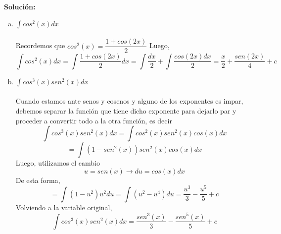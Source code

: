 \documentclass[12pt]{article}
\newenvironment{solucion}
{\begin{mdframed}[backgroundcolor=black!10]
		{\bf Solución:}\\
	}
	{
	\end{mdframed}
}
\newenvironment{preguntas}
{\begin{enumerate}\itemsep12pt
	}
	{
	\end{enumerate}
}
\newcommand{\ra}{\rightarrow}
\begin{document}
\begin{preguntas}
\begin{solucion}
\begin{enumerate}[a)]
\item $\displaystyle\int cos^2(x)dx$\\\\
			Recordemos que $cos^2(x) = \dfrac{1+cos(2x)}{2}$
			Luego,
			$$\displaystyle\int cos^2(x)dx 
			= \displaystyle\int \dfrac{1+cos(2x)}{2}dx
			= \displaystyle\int \dfrac{dx}{2} + \displaystyle\int \dfrac{cos(2x)dx}{2}
			= \dfrac{x}{2} + \dfrac{sen(2x)}{4} + c
			$$
\item $\displaystyle\int cos^3(x)sen^2(x)dx$\\\\
			Cuando estamos ante senos y cosenos y alguno de los exponentes es impar, debemos separar la función que tiene dicho exponente para dejarlo par y proceder a convertir todo a la otra función, es decir
			$$\displaystyle\int cos^3(x)sen^2(x)dx
			= \displaystyle\int cos^2(x)sen^2(x)cos(x)dx$$
			$$= \displaystyle\int (1-sen^2(x))sen^2(x)cos(x)dx$$
			Luego, utilizamos el cambio
			$$u = sen(x) \ra du = cos(x)dx$$
			De esta forma,
			$$= \displaystyle\int (1-u^2)u^2du
			= \displaystyle\int (u^2-u^4)du
			= \dfrac{u^3}{3} - \dfrac{u^5}{5} + c
			$$
			Volviendo a la variable original,
			$$\displaystyle\int cos^3(x)sen^2(x)dx 
			= \dfrac{sen^3(x)}{3} - \dfrac{sen^5(x)}{5} + c$$
			

\end{enumerate}
\end{solucion}
\end{preguntas}
\end{document}
